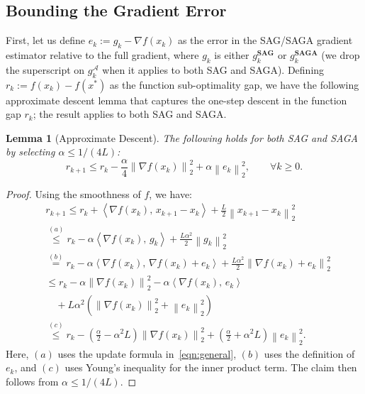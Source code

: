 \documentclass{article}
\theoremstyle{plain}
\newtheorem{lemma}[theorem]{Lemma}
\theoremstyle{definition}
\newcommand{\cA}{\mathcal{A}}
\newcommand{\iprod}[2]{\left\langle #1,\, #2\right\rangle}
\newcommand{\norm}[1]{\left\| #1\right\|_{2}}
\newcommand{\paren}[1]{\left( #1\right)}
\begin{document}
\subsection{Bounding the Gradient Error}\label{sec:bounding_error}
First, let us define $e_k:=g_k-\nabla f(x_k)$ as the error in the SAG/SAGA gradient estimator relative to the full gradient, where $g_k$ is either $g_k^\textbf{SAG}$ or $g_k^\textbf{SAGA}$ (we drop the superscript on $g_k^\cA$ when it applies to both SAG and SAGA). Defining $r_k:=f(x_k)-f(x^*)$ as the function sub-optimality gap, we have the following approximate descent lemma that captures the one-step descent in the function gap $r_k$; the result applies to both SAG and SAGA.
\begin{lemma}[Approximate Descent]\label{lem:approx_descent}
The following holds for both SAG and SAGA by selecting $\alpha\leq 1/(4L)$:
\begin{equation}
    r_{k+1}\leq r_k - \frac{\alpha}{4}\norm{\nabla f(x_k)}^2+\alpha \norm{e_k}^2, \qquad \forall k\geq 0.\label{eqn:onestep}
\end{equation}
\end{lemma}
\begin{proof}
Using the smoothness of $f$, we have: 
\begin{equation}
\begin{aligned}
    &r_{k+1}\leq r_k+\iprod{\nabla f(x_k)}{x_{k+1}-x_k} + \frac{L}{2}\norm{x_{k+1}-x_k}^2\\
    &\overset{(a)}{\leq} r_k-\alpha\iprod{\nabla f(x_k)}{g_k}+\frac{L\alpha^2}{2}\norm{g_k}^2\\
    &\overset{(b)}{=} r_k-\alpha\iprod{\nabla f(x_k)}{\nabla f(x_k)+e_k}+\frac{L\alpha^2}{2}\norm{\nabla f(x_k)+e_k}^2\\
    & \leq r_k - \alpha \norm{\nabla f(x_k)}^2 - \alpha\iprod{\nabla f(x_k)}{e_k}\\
    &\quad +L\alpha^2\paren{\norm{\nabla f(x_k)}^2+\norm{e_k}^2}\\
    &\overset{(c)}\leq r_k - \paren{\frac{\alpha}{2}-\alpha^2L}\norm{\nabla f(x_k)}^2 +\paren{\frac{\alpha}{2}+\alpha^2L}\norm{e_k}^2.\label{eqn:onestep_proof}
\end{aligned}
\nonumber
\end{equation}
Here, $(a)$ uses the update formula in~\eqref{eqn:general}, $(b)$ uses the definition of $e_k$, and $(c)$ uses Young's inequality for the inner product term. The claim then follows from $\alpha\leq 1/(4L)$.
\end{proof}
\end{document}
